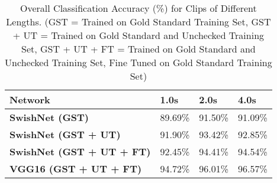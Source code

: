 \begin{table}
	\centering
	\caption{Overall Classification Accuracy (\%) for Clips of Different Lengths. (GST = Trained on Gold Standard Training Set, GST + UT = Trained on Gold Standard and Unchecked Training Set, GST + UT + FT = Trained on Gold Standard and Unchecked Training Set, Fine Tuned on Gold Standard Training Set)}
	\begin{tabular}{M{13em}P{6.5em}P{6.5em}P{6.5em}} 
		
		\toprule
		\textbf{Network} & \textbf{1.0s} & \textbf{2.0s} & \textbf{4.0s} \\
		
		\midrule
		\textbf{SwishNet (GST)} 
        & 89.69\% & 91.50\% & 91.09\% \\
		
		\midrule
		\textbf{SwishNet (GST + UT)}
	    & 91.90\% & 93.42\% & 92.85\% \\
		
		\midrule
		\textbf{SwishNet (GST + UT + FT)} 
        & 92.45\% & 94.41\% & 94.54\% \\
		
		\midrule 
		\textbf{VGG16 (GST + UT + FT)} 
        & 94.72\% & 96.01\% & 96.57\% \\
        
		\bottomrule
	\end{tabular}
	\label{tab:conmat}%
\end{table}